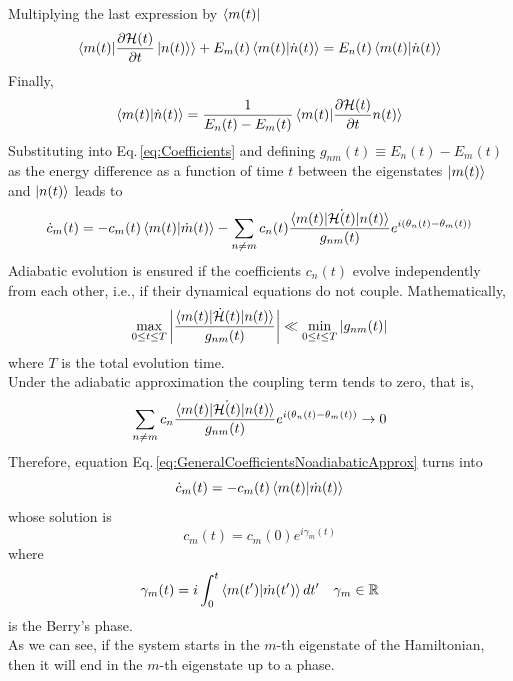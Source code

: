 Multiplying the last expression by $\bra{m(t)}$ 
\begin{equation}
    \braket{m(t)|\frac{\partial\mathcal{H}(t)}{\partial t}\ket{n(t)}} + E_{m}(t)\braket{m(t)|\dot{n}(t)} = E_{n}(t)\braket{m(t)|\dot{n}(t)}
\end{equation}
Finally,
\begin{equation}
    \braket{m(t)|\dot{n}(t)} = \frac{1}{E_{n}(t)-E_{m}(t)}\braket{m(t)|\frac{\partial \mathcal{H}(t)}{\partial t}n(t)}
\end{equation}
Substituting into Eq.\,\eqref{eq:Coefficients} and defining $g_{nm}(t)\equiv E_{n}(t) - E_{m}(t)$ as the energy difference as a function of time $t$ between the eigenstates $\ket{m(t)}$ and $\ket{n(t)}$ leads to
\begin{equation}
\label{eq:GeneralCoefficientsNoadiabaticApprox}
    \dot{c}_{m}(t) = -c_{m}(t) \braket{m(t)|\dot{m}(t)} - \sum_{n\neq m} c_{n}(t)\frac{\braket{m(t)|\dot{\mathcal{H}(t)}|n(t)}}{g_{nm}(t)}e^{i\left(\theta_{n}(t) - \theta_{m}(t)\right)}
\end{equation}
Adiabatic evolution is ensured if the coefficients $c_{n}(t)$ evolve independently from each other, i.e., if their dynamical equations do not couple. Mathematically,
\begin{equation}
    \max_{0 \leq t \leq T} \abs{\frac{\braket{m(t)|\dot{\mathcal{H}}(t)|n(t)}}{g_{nm}(t)}} \ll \min_{0\leq t \leq T} \abs{g_{nm}(t)}
\end{equation}
where $T$ is the total evolution time.\\ 
Under the adiabatic approximation the coupling term tends to zero, that is,
\begin{equation}
    \sum_{n\neq m} c_{n}\frac{\braket{m(t)|\dot{\mathcal{H}(t)}|n(t)}}{g_{nm}(t)}e^{i\left(\theta_{n}(t) - \theta_{m}(t)\right)} \to 0
\end{equation}
Therefore, equation Eq.\,\eqref{eq:GeneralCoefficientsNoadiabaticApprox} turns into
\begin{equation}
    \dot{c}_{m}(t) = -c_{m}(t)\braket{m(t)|\dot{m}(t)}
\end{equation}
whose solution is
\begin{equation}
    c_{m}(t) = c_{m}(0)e^{i\gamma_{m}(t)}
\end{equation}
where
\begin{equation}
    \gamma_{m}(t) = i\int_{0}^{t}\braket{m(t^{\prime})|\dot{m}(t^{\prime})}dt^{\prime} \quad \gamma_{m}\in \mathbb{R}
\end{equation}
is the Berry's phase.\\
As we can see, if the system starts in the $m$-th eigenstate of the Hamiltonian, then it will end in the $m$-th eigenstate up to a phase.
